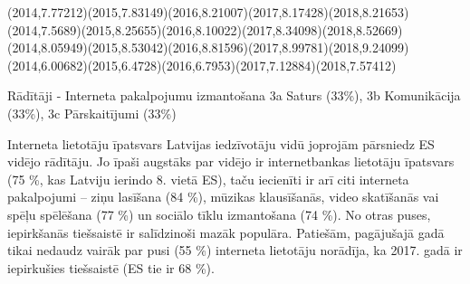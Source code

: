  {(2014,7.77212)(2015,7.83149)(2016,8.21007)(2017,8.17428)(2018,8.21653)}
  {(2014,7.5689)(2015,8.25655)(2016,8.10022)(2017,8.34098)(2018,8.52669)}
  {(2014,8.05949)(2015,8.53042)(2016,8.81596)(2017,8.99781)(2018,9.24099)}
  {(2014,6.00682)(2015,6.4728)(2016,6.7953)(2017,7.12884)(2018,7.57412)}

Rādītāji - Interneta pakalpojumu izmantošana
3a Saturs (33\%), 3b Komunikācija (33\%), 3c Pārskaitījumi (33\%)

Interneta lietotāju īpatsvars Latvijas iedzīvotāju vidū joprojām pārsniedz ES vidējo rādītāju.
Jo īpaši augstāks par vidējo ir internetbankas lietotāju īpatsvars (75 \%, kas Latviju ierindo 8.
vietā ES), taču iecienīti ir arī citi interneta pakalpojumi – ziņu lasīšana (84 \%), mūzikas
klausīšanās, video skatīšanās vai spēļu spēlēšana (77 \%) un sociālo tīklu izmantošana
(74 \%). No otras puses, iepirkšanās tiešsaistē ir salīdzinoši mazāk populāra. Patiešām,
pagājušajā gadā tikai nedaudz vairāk par pusi (55 \%) interneta lietotāju norādīja, ka 2017.
gadā ir iepirkušies tiešsaistē (ES tie ir 68 \%).
